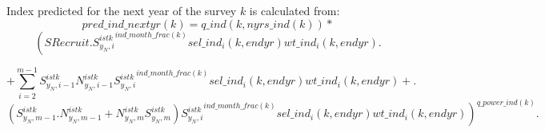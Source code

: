 \documentclass{article}
\begin{document}

Index predicted for the next year of the survey $k$ is calculated from:
\begin{equation}
    pred\_ind\_nextyr(k)=q\_ind(k,nyrs\_ind(k)) * 
\end{equation}
\begin{equation*}
    \left( SRecruit. {S^{istk}_{y_N,i}}^{ind\_month\_frac(k)} sel\_ind_i(k,endyr)  wt\_ind_i(k,endyr).\right.
\end{equation*}

\begin{equation}
+\sum_{i=2}^{m-1}S^{istk}_{y_N,i-1}N^{istk}_{y_N,i-1}{S^{istk}_{y_N,i}}^{ind\_month\_frac(k)} sel\_ind_i(k,endyr)  wt\_ind_i(k,endyr)+.
\end{equation}
\begin{equation*}
  \left. (S^{istk}_{y_N,m-1}.N^{istk}_{y_N,m-1}+N^{istk}_{y_N,m}S^{istk}_{y_N,m}){S^{istk}_{y_N,i}}^{ind\_month\_frac(k)} sel\_ind_i(k,endyr)  wt\_ind_i(k,endyr) \right)^{q\_power\_ind(k)}.
\end{equation*}
\end{document}
